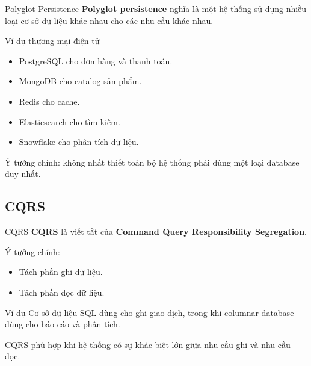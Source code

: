 \documentclass[aspectratio=169,11pt]{beamer}
\newcommand{\keyword}[1]{\textcolor{accent}{\textbf{#1}}}
\newcommand{\kw}[1]{\keyword{#1}}
\newcommand{\smallitem}{\setlength{\itemsep}{2pt}\setlength{\parskip}{0pt}}
\begin{document}
\begin{frame}{Polyglot Persistence}
\kw{Polyglot persistence} nghĩa là một hệ thống sử dụng nhiều loại cơ sở dữ liệu khác nhau cho các nhu cầu khác nhau.

\begin{exampleblock}{Ví dụ thương mại điện tử}
\begin{itemize}
  \smallitem
  \item PostgreSQL cho đơn hàng và thanh toán.
  \item MongoDB cho catalog sản phẩm.
  \item Redis cho cache.
  \item Elasticsearch cho tìm kiếm.
  \item Snowflake cho phân tích dữ liệu.
\end{itemize}
\end{exampleblock}

Ý tưởng chính: không nhất thiết toàn bộ hệ thống phải dùng một loại database duy nhất.
\end{frame}

\subsection{CQRS}
\begin{frame}{CQRS}
\kw{CQRS} là viết tắt của \kw{Command Query Responsibility Segregation}.

\vspace{2mm}
Ý tưởng chính:
\begin{itemize}
  \smallitem
  \item Tách phần ghi dữ liệu.
  \item Tách phần đọc dữ liệu.
\end{itemize}

\begin{exampleblock}{Ví dụ}
Cơ sở dữ liệu SQL dùng cho ghi giao dịch, trong khi columnar database dùng cho báo cáo và phân tích.
\end{exampleblock}

CQRS phù hợp khi hệ thống có sự khác biệt lớn giữa nhu cầu ghi và nhu cầu đọc.
\end{frame}
\end{document}
